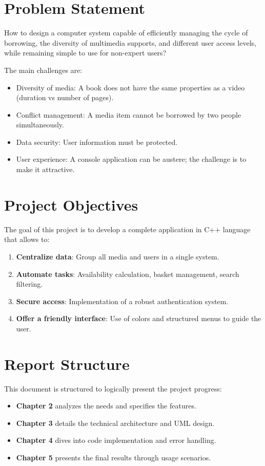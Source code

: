 \documentclass[12pt,a4paper]{report}
\begin{document}
\section{Problem Statement}
How to design a computer system capable of efficiently managing the cycle of borrowing, the diversity of multimedia supports, and different user access levels, while remaining simple to use for non-expert users?

The main challenges are:
\begin{itemize}
    \item Diversity of media: A book does not have the same properties as a video (duration vs number of pages).
    \item Conflict management: A media item cannot be borrowed by two people simultaneously.
    \item Data security: User information must be protected.
    \item User experience: A console application can be austere; the challenge is to make it attractive.
\end{itemize}

\section{Project Objectives}
The goal of this project is to develop a complete application in C++ language that allows to:
\begin{enumerate}
    \item \textbf{Centralize data}: Group all media and users in a single system.
    \item \textbf{Automate tasks}: Availability calculation, basket management, search filtering.
    \item \textbf{Secure access}: Implementation of a robust authentication system.
    \item \textbf{Offer a friendly interface}: Use of colors and structured menus to guide the user.
\end{enumerate}

\section{Report Structure}
This document is structured to logically present the project progress:
\begin{itemize}
    \item \textbf{Chapter 2} analyzes the needs and specifies the features.
    \item \textbf{Chapter 3} details the technical architecture and UML design.
    \item \textbf{Chapter 4} dives into code implementation and error handling.
    \item \textbf{Chapter 5} presents the final results through usage scenarios.
\end{itemize}
\end{document}
